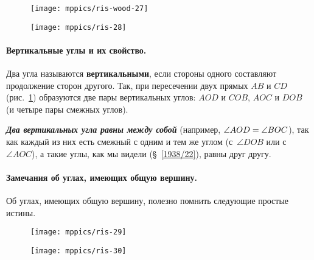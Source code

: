 \begin{figure}[!ht]
\begin{minipage}{.48\textwidth}
\centering
\texttt{[image: mppics/ris-wood-27]}
\end{minipage}\hfill
\begin{minipage}{.48\textwidth}
\centering
\texttt{[image: mppics/ris-28]}
\end{minipage}

\medskip

\begin{minipage}{.48\textwidth}
\centering
\caption{}\label{1938/ris-27}
\end{minipage}\hfill
\begin{minipage}{.48\textwidth}
\centering
\caption{}\label{1938/ris-28}
\end{minipage}
\vskip-4mm
\end{figure}


\paragraph{Вертикальные углы и их свойство.}\label{1938/26}
Два угла называются \textbf{вертикальными}, если стороны одного составляют продолжение сторон другого.
Так, при пересечении двух прямых $AB$ и $CD$ (рис.~\ref{1938/ris-28}) образуются две пары вертикальных углов:
$AOD$ и $COB$, $AOC$ и $DOB$ (и четыре пары смежных углов).

{\sloppy

\textbf{\emph{Два вертикальных угла равны между собой}} (например, $\angle AOD \z= \angle BOC$), так как каждый из них есть смежный с одним и тем же углом (с~$\angle DOB$ или с~$\angle AOC$), а такие углы, как мы видели (§~\ref{1938/22}), равны друг другу.

}

\paragraph{Замечания об углах, имеющих общую вершину.}\label{1938/27}
Об углах, имеющих общую вершину, полезно помнить следующие простые истины.

\begin{figure}[!ht]
\begin{minipage}{.48\textwidth}
\centering
\texttt{[image: mppics/ris-29]}
\end{minipage}\hfill
\begin{minipage}{.48\textwidth}
\centering
\texttt{[image: mppics/ris-30]}
\end{minipage}

\medskip

\begin{minipage}{.48\textwidth}
\centering
\caption{}\label{1938/ris-29}
\end{minipage}\hfill
\begin{minipage}{.48\textwidth}
\centering
\caption{}\label{1938/ris-30}
\end{minipage}
\vskip-4mm
\end{figure}

